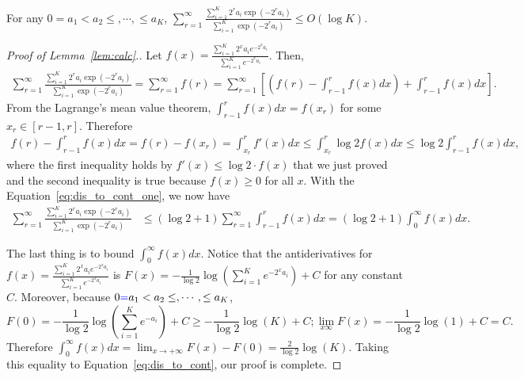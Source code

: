 \begin{lemma}
\label{lem:calc}
	For any $0=a_1<a_2\leq, \cdots, \leq a_K$, $\sum_{r=1}^{\infty} \frac{\sum_{i=1}^{K}2^{r}a_i\exp\left( -2^{r}a_i \right)}{\sum_{i=1}^K\exp\left( -2^{r}a_i\right)} \leq O(\log K).$
\end{lemma}
\begin{proof}[Proof of Lemma~\ref{lem:calc}.]
Let $f(x) = \frac{\sum_{i=1}^K 2^xa_i e^{- 2^xa_i}}{\sum_{i=1}^K e^{-2^xa_i}}$. Then, 
	\begin{align*}
	\sum_{r=1}^{\infty} \frac{\sum_{i=1}^{K}2^{r}a_i\exp\left( -2^{r}a_i \right)}{\sum_{i=1}^K\exp\left( -2^{r}a_i\right)} = \sum_{r=1}^{\infty} f(r) = \sum_{r=1}^{\infty} \left[\left(f(r) - \int_{r-1}^{r}f(x)dx\right) + \int_{r-1}^{r}f(x)dx \right].
	\end{align*}
	From the Lagrange's mean value theorem, $\int_{r-1}^{r}f(x)dx = f(x_r)$ for some $x_r\in [r-1, r]$.
	Therefore 
	\begin{align}
	\label{eq:dis_to_cont_one}
	f(r) - \int_{r-1}^{r}f(x)dx = f(r) - f(x_r)= \int_{x_r}^r f'(x) dx \leq \int_{x_r}^r \log2f(x) dx  \leq \log2\int_{r-1}^r f(x) dx,
	\end{align}
	where the first inequality holds by $f'(x)\leq \log 2\cdot f(x)$ that we just proved and the second inequality is true because $f(x)\geq 0$ for all $x$.
	With the Equation~\ref{eq:dis_to_cont_one}, we now have
	\begin{align}
	\label{eq:dis_to_cont}
	\sum_{r=1}^{\infty} \frac{\sum_{i=1}^{K}2^{r}a_i\exp\left( -2^{r}a_i \right)}{\sum_{i=1}^K\exp\left( -2^{r}a_i\right)}
	& \leq(\log2 + 1)\sum_{r=1}^{\infty}  \int_{r-1}^{r}f(x)dx = (\log2 + 1)\int_{0}^{\infty}f(x)dx.
	\end{align}
	
	The last thing is to bound $\int_{0}^{\infty}f(x)dx$. Notice that the antiderivatives for $ f(x) = \frac{\sum_{i=1}^K 2^xa_i e^{- 2^xa_i}}{\sum_{i=1}^K e^{-2^xa_i}}$ is $F(x) = -\frac{1}{
	\log 2}\log\left( \sum_{i=1}^K e^{- 2^xa_i} \right) + C$ for any constant $C$.
	Moreover, because $0 {\color{blue}=} a_1 < a_2\leq, \cdots, \leq a_K$,
	$$F(0) = -\frac{1}{
	\log 2}\log\left( \sum_{i=1}^K e^{- a_i} \right) + C \geq -\frac{1}{
	\log 2}\log\left( K \right) + C;\lim_{x\infty}F(x) =-\frac{1}{
	\log 2}\log\left( 1 \right) + C = C.$$ 	
	Therefore $\int_{0}^{\infty}f(x)dx = \lim_{x\to+\infty}F(x) - F(0) = \frac{2}{
	\log 2}\log(K)$. 	Taking this equality to Equation~\ref{eq:dis_to_cont}, our proof is complete.
\end{proof}

